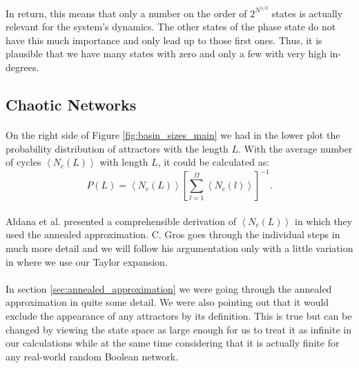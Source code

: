 \paragraph*{}
In return, this means that only a number on the order of $2^{N^{1/3}}$ states is actually relevant for the system's dynamics. The other states of the phase state do not have this much importance and only lead up to those first ones. Thus, it is plausible that we have many states with zero and only a few with very high in-degrees.

\subsection{Chaotic Networks}
\paragraph*{}
On the right side of Figure \ref{fig:basin_sizes_main} we had in the lower plot the probability distribution of attractors with the length $L$. With the average number of cycles $\left\langle N_c(L) \right\rangle$ with length $L$, it could be calculated as:
\begin{equation}\label{eq:length_probability_raw}
P(L)=\left\langle N_c(L) \right\rangle  \left[\sum\limits_{l=1}^{\Omega} \left\langle N_c(l) \right\rangle\right]^{-1}.
\end{equation}

\paragraph*{}
Aldana et al. \cite{aldana2003boolean} presented a comprehensible derivation of $\left\langle N_c(L) \right\rangle$ in which they used the annealed approximation. C. Gros \cite{gros2010complex} goes through the individual steps in much more detail and we will follow his argumentation only with a little variation in where we use our Taylor expansion.

\paragraph*{}
In section \ref{sec:annealed_approximation} we were going through the annealed approximation in quite some detail. We were also pointing out that it would exclude the appearance of any attractors by its definition. This is true but can be changed by viewing the state space as large enough for us to treat it as infinite in our calculations while at the same time considering that it is actually finite for any real-world random Boolean network.

